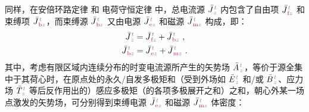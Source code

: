 同样，在安倍环路定律  和 电荷守恒定律  中，总电流源 $\bar{J}^{\;\!\mathcolor{gray}{t}}_{\;\!\mathcolor{gray}{z}}$ 内包含了自由项 $\bar{J}^{\;\!\mathcolor{gray}{t}}_{\;\!\textcolor{Maroon}{\text{f}}\mathcolor{gray}{z}}$ 和束缚项 $\bar{J}^{\;\!\mathcolor{gray}{t}}_{\;\!\textcolor{Maroon}{\text{b}}\mathcolor{gray}{z}}$\cite{langeMultipoleTheoryHehl2015,raabMultipoleTheoryElectromagnetism2004}，而束缚源 $\bar{J}^{\;\!\mathcolor{gray}{t}}_{\;\!\textcolor{Maroon}{\text{b}}\mathcolor{gray}{z}}$ 又由电源 $\bar{J}^{\;\!\mathcolor{gray}{t}}_{\;\!\textcolor{Maroon}{\text{e}}\mathcolor{gray}{z}}$ 和磁源 $\bar{J}^{\;\!\mathcolor{gray}{t}}_{\;\!\textcolor{Maroon}{\text{m}}\mathcolor{gray}{z}}$ 构成，即：
\begin{subequations} \label{eq:j-fbem}
	\abovedisplayskip=-5pt
	\belowdisplayskip=10pt
\begin{align}
	\bar{J}^{\;\!\mathcolor{gray}{t}}_{\;\!\mathcolor{gray}{z}} &= \bar{J}^{\;\!\mathcolor{gray}{t}}_{\;\!\textcolor{Maroon}{\text{f}}\mathcolor{gray}{z}} + \bar{J}^{\;\!\mathcolor{gray}{t}}_{\;\!\textcolor{Maroon}{\text{b}}\mathcolor{gray}{z}}~, \label{eq:j=f+b} \\ \bar{J}^{\;\!\mathcolor{gray}{t}}_{\;\!\textcolor{Maroon}{\text{b}}\mathcolor{gray}{z}} &= \bar{J}^{\;\!\mathcolor{gray}{t}}_{\;\!\textcolor{Maroon}{\text{e}}\mathcolor{gray}{z}} + \bar{J}^{\;\!\mathcolor{gray}{t}}_{\;\!\textcolor{Maroon}{\text{m}}\mathcolor{gray}{z}}~. \label{eq:b=e+m}
\end{align}
\end{subequations}
其中，考虑有限区域内连续分布的时变电流源所产生的矢势场 $\bar{A}^{\;\!\mathcolor{gray}{t}}_{\;\!\mathcolor{gray}{z}}$，等价于源全集中于其荷心时，在原点处的永久/自发多极矩和（受到外场如 $\bar{E}^{\;\!\mathcolor{gray}{t}}_{\;\!\mathcolor{gray}{z}}$ 和/或 $\bar{B}^{\;\!\mathcolor{gray}{t}}_{\;\!\mathcolor{gray}{z}}$、应力场 $\bar{T}^{\;\!\mathcolor{gray}{t}}_{\;\!\mathcolor{gray}{z}}$ 等后反作用出的）感应多极矩（的各项多极展开之和）之和，朝心外某一场点激发的矢势场\cite{raabMultipoleTheoryElectromagnetism2004,delangeTranslationalInvariancePost2012,chen-zhuChenZhuxieUndergraduate_courses2024}，可分别得到束缚电源 $\bar{J}^{\;\!\mathcolor{gray}{t}}_{\;\!\textcolor{Maroon}{\text{e}}\mathcolor{gray}{z}}$ 和磁源 $\bar{J}^{\;\!\mathcolor{gray}{t}}_{\;\!\textcolor{Maroon}{\text{m}}\mathcolor{gray}{z}}$ 体密度：
